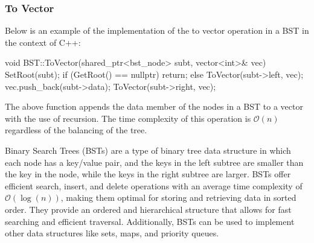 \begin{highlight}

\subsubsection*{To Vector}

Below is an example of the implementation of the to vector operation in a BST in the context of C++:

\begin{code}
void BST::ToVector(shared_ptr<bst_node> subt, vector<int>& vec){
    SetRoot(subt);
    if (GetRoot() == nullptr) {
        return;
    }
    else {
        ToVector(subt->left, vec);
        vec.push_back(subt->data);
        ToVector(subt->right, vec);
    }
}
\end{code}

\noindent The above function appends the data member of the nodes in a BST to a vector with the use of recursion. The time complexity of this operation is $\mathcal{O}(n)$ regardless of the balancing
of the tree.
    
\end{highlight}

Binary Search Trees (BSTs) are a type of binary tree data structure in which each node has a key/value pair, and the keys in the left subtree are smaller than the key in the node, while the keys in the 
right subtree are larger. BSTs offer efficient search, insert, and delete operations with an average time complexity of $\mathcal{O}(\log{(n)})$, making them optimal for storing and retrieving data in 
sorted order. They provide an ordered and hierarchical structure that allows for fast searching and efficient traversal. Additionally, BSTs can be used to implement other data structures like sets, maps, 
and priority queues.

\clearpage